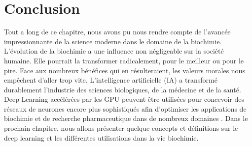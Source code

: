 \documentclass[12pt]{report}
\begin{document}
\section{Conclusion}
Tout a long de ce chapitre, nous avons pu nous rendre compte de l'avancée impressionnante de la science moderne dans le domaine de la biochimie. L'évolution de la biochimie a une influence non négligeable sur la société humaine. Elle pourrait la transformer radicalement, pour le meilleur ou pour le pire. Face aux nombreux bénéfices qui en résulteraient, les valeurs morales nous empêchent d'aller trop vite.
L'intelligence artificielle (IA) a transformé durablement l'industrie des sciences biologiques, de la médecine et de la santé. Deep Learning accélérées par les GPU peuvent être utilisées pour concevoir des réseaux de neurones encore plus sophistiqués afin d'optimiser les applications de biochimie et de recherche pharmaceutique dans de nombreux domaines .
Dans le prochain chapitre, nous allons présenter quelque concepts et définitions sur  le deep learning et les différentes utilisations dans la vie biochimie.
\end{document}
